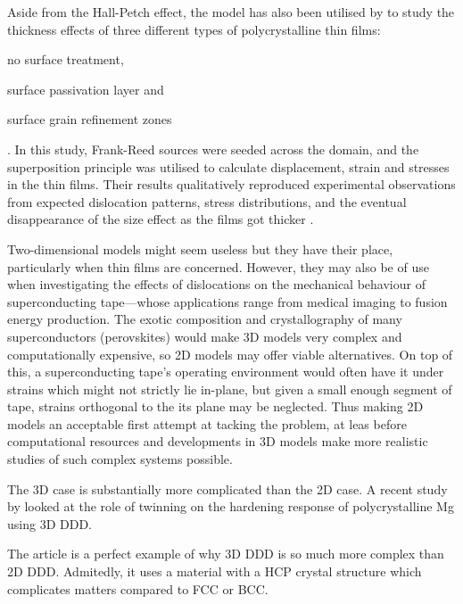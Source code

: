 Aside from the Hall-Petch effect, the model has also been utilised by \cite{2d_pcm2} to study the thickness effects of three different types of polycrystalline thin films:
\begin{inparaenum}[\itshape 1\upshape )]
	\item no surface treatment,
	\item surface passivation layer and
	\item surface grain refinement zones
\end{inparaenum}. In this study, Frank-Reed sources were seeded across the domain, and the superposition principle was utilised to calculate displacement, strain and stresses in the thin films. Their results qualitatively reproduced experimental observations from expected dislocation patterns, stress distributions, and the eventual disappearance of the size effect as the films got thicker \cite{2d_pcm2}.

Two-dimensional models might seem useless but they have their place, particularly when thin films are concerned. However, they may also be of use when investigating the effects of dislocations on the mechanical behaviour of superconducting tape---whose applications range from medical imaging to fusion energy production. The exotic composition and crystallography of many superconductors (perovskites) would make 3D models very complex and computationally expensive, so 2D models may offer viable alternatives. On top of this, a superconducting tape's operating environment would often have it under strains which might not strictly lie in-plane, but given a small enough segment of tape, strains orthogonal to the its plane may be neglected. Thus making 2D models an acceptable first attempt at tacking the problem, at leas before computational resources and developments in 3D models make more realistic studies of such complex systems possible.

The 3D case is substantially more complicated than the 2D case. A recent study by \citet{twinning} looked at the role of twinning on the hardening response of polycrystalline Mg using 3D DDD.

The article is a perfect example of why 3D DDD is so much more complex than 2D DDD. Admitedly, it uses a material with a HCP crystal structure which complicates matters compared to FCC or BCC.


